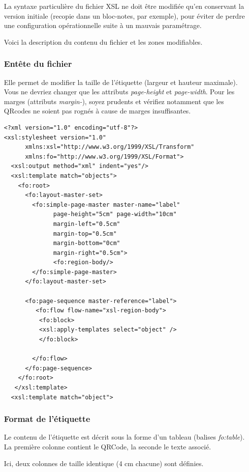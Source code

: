 La syntaxe particulière du fichier XSL ne doit être modifiée qu'en conservant la version initiale (recopie dans un bloc-notes, par exemple), pour éviter de perdre une configuration opérationnelle suite à un mauvais paramétrage.

Voici la description du contenu du fichier et les zones modifiables.

\subsubsection{Entête du fichier}
Elle permet de modifier la taille de l'étiquette (largeur et hauteur maximale). Vous ne devriez changer que les attributs \textit{page-height} et \textit{page-width}. Pour les marges (attributs \textit{margin-}), soyez prudents et vérifiez notamment que les QRcodes ne soient pas rognés à cause de marges insuffisantes.

\begin{lstlisting}
<?xml version="1.0" encoding="utf-8"?>
<xsl:stylesheet version="1.0"
      xmlns:xsl="http://www.w3.org/1999/XSL/Transform"
      xmlns:fo="http://www.w3.org/1999/XSL/Format">
  <xsl:output method="xml" indent="yes"/>
  <xsl:template match="objects">
    <fo:root>
      <fo:layout-master-set>
        <fo:simple-page-master master-name="label"
              page-height="5cm" page-width="10cm" 
              margin-left="0.5cm" 
              margin-top="0.5cm" 
              margin-bottom="0cm" 
              margin-right="0.5cm">  
              <fo:region-body/>
        </fo:simple-page-master>
      </fo:layout-master-set>
      
      <fo:page-sequence master-reference="label">
         <fo:flow flow-name="xsl-region-body">        
          <fo:block>
          <xsl:apply-templates select="object" />
          </fo:block>

        </fo:flow>
      </fo:page-sequence>
    </fo:root>
   </xsl:template>
  <xsl:template match="object">
\end{lstlisting}

\subsubsection{Format de l'étiquette}
Le contenu de l'étiquette est décrit sous la forme d'un tableau (balises \textit{fo:table}). La première colonne contient le QRCode, la seconde le texte associé.

Ici, deux colonnes de taille identique (4 cm chacune) sont définies.


